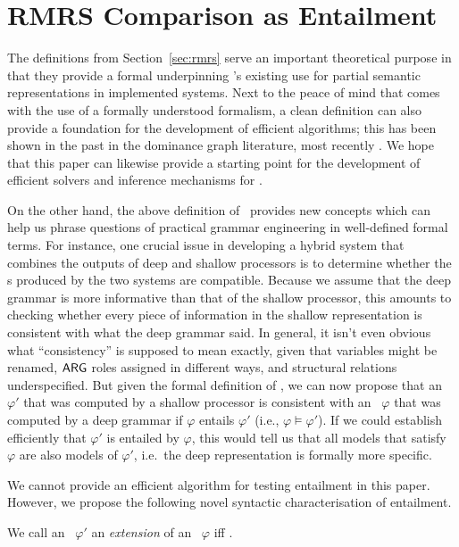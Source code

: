 \section{RMRS Comparison as Entailment}
\label{sec:entailment}

The definitions from Section~\ref{sec:rmrs} serve an important theoretical
purpose in that they provide a formal underpinning \rmrs's existing use
for partial semantic representations in implemented
systems.  Next to the peace of
mind that comes with the use of a formally understood formalism, a
clean definition can also provide a foundation for the development of
efficient algorithms; this has been shown in the past in the dominance
graph literature, most recently .  We hope that
this paper can likewise provide a starting point for the development
of efficient solvers and inference mechanisms for \rmrs.

On the other hand, the above definition of \rmrs\ provides new
concepts which can help us phrase questions of practical grammar
engineering in well-defined formal terms.  For instance, one crucial
issue in developing a hybrid system that combines the outputs of deep
and shallow processors is to determine whether the \rmrs s produced by
the two systems are compatible.  Because we assume that the deep
grammar is more informative than that of the shallow processor, this
amounts to checking whether every piece of information in the shallow
representation is consistent with what the deep grammar said.  In
general, it isn't even obvious what ``consistency'' is supposed to
mean exactly, given that variables might be renamed, $\mathsf{ARG}$ roles
assigned in different ways, and structural relations underspecified.
But given the formal definition of \rmrs, we can now propose that an
\rmrs\ $\varphi'$ that was computed by a shallow processor is
consistent with an \rmrs\ $\varphi$ that was computed by a deep
grammar if $\varphi$ entails $\varphi'$ (i.e., $\varphi \models
\varphi'$).  If we could establish 
efficiently that $\varphi'$ is entailed by $\varphi$, this would tell
us that all models that satisfy $\varphi$ are also models of
$\varphi'$, i.e.\ the deep representation is formally more specific.

We cannot provide an efficient algorithm for testing entailment in
this paper.  However, we propose the following novel syntactic
characterisation of entailment.

\begin{definition}
  We call an \rmrs\ $\varphi'$ an \emph{extension} of an \rmrs\
  $\varphi$ iff \todo{fill this in -- don't have the def with me right
    now}.
\end{definition}

